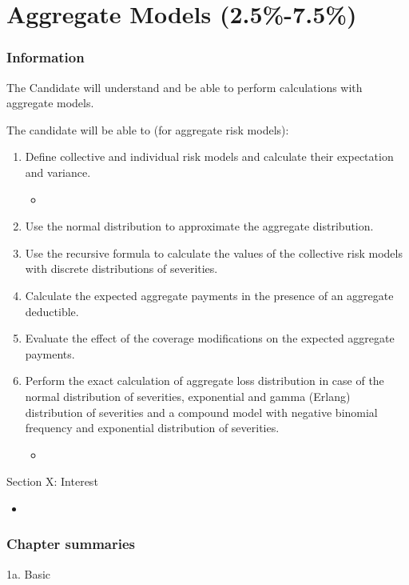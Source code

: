 \chapter[Aggregate Models]{Aggregate Models (2.5\%-7.5\%)}

\subsection{Information}

\begin{distributions}[Objective]
The Candidate will understand and be able to perform calculations with aggregate models.
\end{distributions}

\begin{outcomes}
The candidate will be able to (for aggregate risk models):
\begin{enumerate}[label = \alph*), leftmargin = *]
	\item	Define collective and individual risk models and calculate their expectation and variance.
		\begin{itemize}[leftmargin = *]
		\item	
		\end{itemize}
	\item	Use the normal distribution to approximate the aggregate distribution.
	\item	Use the recursive formula to calculate the values of the collective risk models with discrete distributions of severities.
	\item	Calculate the expected aggregate payments in the presence of an aggregate deductible.
	\item	Evaluate the effect of the coverage modifications on the expected aggregate payments.
	\item	Perform the exact calculation of aggregate loss distribution in case of the normal distribution of severities, exponential and gamma (Erlang) distribution of severities and a compound model with negative binomial frequency and exponential distribution of severities.
		\begin{itemize}[leftmargin = *]
		\item	
		\end{itemize}
\end{enumerate}
\end{outcomes}

\begin{ASM_chapter}
Section X: Interest 
\begin{itemize}[leftmargin = *]
	\item	{}
\end{itemize}
\end{ASM_chapter}

\subsection{Chapter summaries}

\begin{CHPT_SUMM_AUTO}[label = {L.-1a}]{1a. Basic}

\end{CHPT_SUMM_AUTO}
